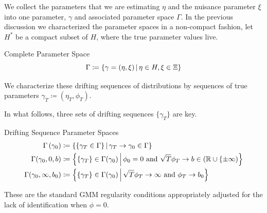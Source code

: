 \documentclass[11pt]{article}
\newcommand*{\R}{\mathbb{R}}
\newcommand*{\Eta}{H}
\newcommand{\mvert}[1][\middle]{\ensuremath{\,#1\vert\,}}
\begin{document}
We collect the parameters that we are estimating $\eta$ and the nuisance parameter $\xi$ into one parameter,
$\gamma$ and associated parameter space $\Gamma$.
In the previous discussion we characterized the parameter spaces in a non-compact fashion, let $\Eta^{*}$ be a
compact subset of $\Eta$, where the true parameter values live.

\begin{defn}{Complete Parameter Space}
    \begin{equation}
        \Gamma \coloneqq \left\lbrace \gamma = (\eta, \xi) \mvert \eta \in \Eta, \xi \in \Xi \right\rbrace 
    \end{equation}
\end{defn}

We characterize these drifting sequences of distributions by sequences of true parameters $\gamma_T \coloneqq
(\eta_T, \phi_T)$.

In what follows, three sets of drifting sequences $\lbrace \gamma_T \rbrace$ are key. 

\begin{defn}{Drifting Sequence Parameter Spaces}
    \begin{align}
        \Gamma\left(\gamma_0\right) &\coloneqq \left\lbrace \left\lbrace \gamma_T \in \Gamma \right\rbrace \mvert
            \gamma_T \to \gamma_0 \in \Gamma \right\rbrace\\ 
        \Gamma(\gamma_0, 0, b) &\coloneqq \left\lbrace \lbrace \gamma_T \rbrace \in \Gamma(\gamma_0) \mvert \phi_0 =
        0\ \text{and}\ \sqrt{T} \phi_T \to b \in (\R \cup \lbrace \pm \infty) \right\rbrace \\
        \Gamma(\gamma_0, \infty, b_0) &\coloneqq \left\lbrace \lbrace \gamma_T \rbrace \in \Gamma (\gamma_0) \mvert
        \sqrt{T} \phi_T \to \infty\ \text{and}\ \phi_T \to b_0 \right\rbrace 
    \end{align}
\end{defn}

These are the standard GMM regularity conditions appropriately adjusted for the lack of identification when $\phi
=0$.
\end{document}
